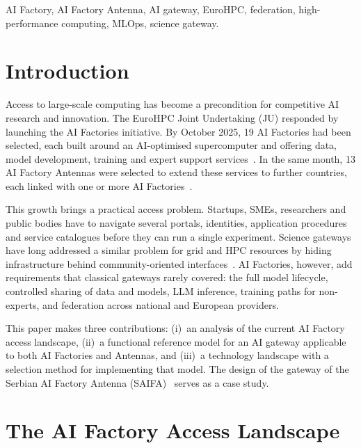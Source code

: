 \documentclass[conference,a4paper]{IEEEtran}
\begin{document}
\begin{IEEEkeywords}
AI Factory, AI Factory Antenna, AI gateway, EuroHPC, federation, high-performance computing, MLOps, science gateway.
\end{IEEEkeywords}

\section{Introduction}

Access to large-scale computing has become a precondition for competitive AI research and innovation. The EuroHPC Joint Undertaking (JU) responded by launching the AI Factories initiative. By October 2025, 19 AI Factories had been selected, each built around an AI-optimised supercomputer and offering data, model development, training and expert support services~\cite{eurohpc_aif,eurohpc_six_aif}. In the same month, 13 AI Factory Antennas were selected to extend these services to further countries, each linked with one or more AI Factories~\cite{eurohpc_antennas,eurohpc_antennas_page}.

This growth brings a practical access problem. Startups, SMEs, researchers and public bodies have to navigate several portals, identities, application procedures and service catalogues before they can run a single experiment. Science gateways have long addressed a similar problem for grid and HPC resources by hiding infrastructure behind community-oriented interfaces~\cite{wilkinsdiehr2007,hudak2018ood}. AI Factories, however, add requirements that classical gateways rarely covered: the full model lifecycle, controlled sharing of data and models, LLM inference, training paths for non-experts, and federation across national and European providers.

This paper makes three contributions: (i)~an analysis of the current AI Factory access landscape, (ii)~a functional reference model for an AI gateway applicable to both AI Factories and Antennas, and (iii)~a technology landscape with a selection method for implementing that model. The design of the gateway of the Serbian AI Factory Antenna (SAIFA)~\cite{cordis_saifa,saifa_d31} serves as a case study.

\section{The AI Factory Access Landscape}
\end{document}
